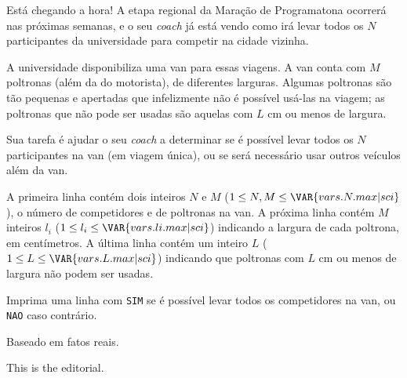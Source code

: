 Está chegando a hora! A etapa regional da Maração de Programatona ocorrerá nas
próximas semanas, e o seu \textit{coach} já está vendo como irá levar todos os $N$
participantes da universidade para competir na cidade vizinha.

A universidade disponibiliza uma van para essas viagens. A van conta com $M$
poltronas (além da do motorista), de diferentes larguras. Algumas poltronas são tão pequenas e
apertadas que infelizmente não é possível usá-las na viagem; as poltronas que
não pode ser usadas são aquelas com $L$ cm ou menos de largura.

Sua tarefa é ajudar o seu \textit{coach} a determinar se é possível levar todos
os $N$ participantes na van (em viagem única), ou se será necessário usar outros veículos além da van.


A primeira linha contém dois inteiros $N$ e $M$ ($1 \leq N, M \leq \VAR{vars.N.max | sci}$), o número de competidores e de poltronas na van.
A próxima linha contém $M$ inteiros $l_i$ ($1 \leq l_i \leq \VAR{vars.li.max | sci}$)
indicando a largura de cada poltrona, em centímetros.
A última linha contém um inteiro $L$ ($1 \leq L \leq \VAR{vars.L.max | sci}$)
indicando que poltronas com $L$ cm ou menos de largura não podem ser usadas.

Imprima uma linha com
\texttt{SIM} se é possível levar todos os competidores na
van, ou \texttt{NAO} caso contrário.

Baseado em fatos reais.

This is the editorial.

